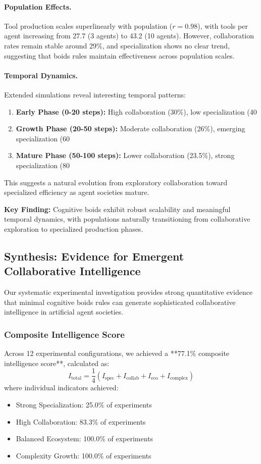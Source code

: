 \paragraph{Population Effects.}
Tool production scales superlinearly with population ($r = 0.98$), with tools per agent increasing from 27.7 (3 agents) to 43.2 (10 agents). However, collaboration rates remain stable around 29\%, and specialization shows no clear trend, suggesting that boids rules maintain effectiveness across population scales.

\paragraph{Temporal Dynamics.}
Extended simulations reveal interesting temporal patterns:
\begin{enumerate}
    \item \textbf{Early Phase (0-20 steps):} High collaboration (30\%), low specialization (40%
    \item \textbf{Growth Phase (20-50 steps):} Moderate collaboration (26\%), emerging specialization (60%
    \item \textbf{Mature Phase (50-100 steps):} Lower collaboration (23.5\%), strong specialization (80%
\end{enumerate}

This suggests a natural evolution from exploratory collaboration toward specialized efficiency as agent societies mature.

\textbf{Key Finding:} Cognitive boids exhibit robust scalability and meaningful temporal dynamics, with populations naturally transitioning from collaborative exploration to specialized production phases.

\subsection{Synthesis: Evidence for Emergent Collaborative Intelligence}

Our systematic experimental investigation provides strong quantitative evidence that minimal cognitive boids rules can generate sophisticated collaborative intelligence in artificial agent societies.

\subsubsection{Composite Intelligence Score}
Across 12 experimental configurations, we achieved a **77.1\% composite intelligence score**, calculated as:
\[
I_{\text{total}} = \frac{1}{4}(I_{\text{spec}} + I_{\text{collab}} + I_{\text{eco}} + I_{\text{complex}})
\]
where individual indicators achieved:
\begin{itemize}
    \item Strong Specialization: 25.0\% of experiments
    \item High Collaboration: 83.3\% of experiments  
    \item Balanced Ecosystem: 100.0\% of experiments
    \item Complexity Growth: 100.0\% of experiments
\end{itemize}


